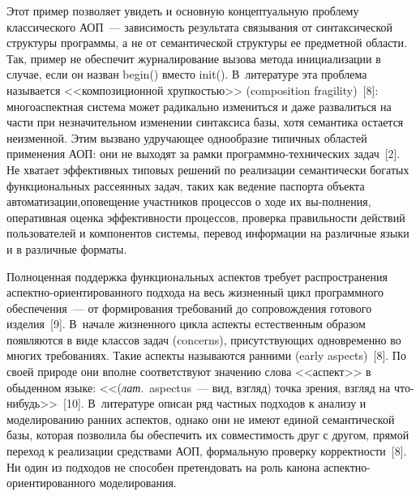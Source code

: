 \begin{multicols}{2}
   Этот пример позволяет увидеть и основную концептуальную проблему 
классического АОП~--- зависи\-мость результата связывания от синтак\-сической 
структуры программы, а не от семан\-ти\-ческой структуры ее предметной 
области. Так, \mbox{пример} не обеспечит журналирование вызова метода 
инициализации в случае, если он назван {\sf begin()} вмес\-то {\sf init()}. 
В~литературе эта проблема называется <<композиционной хрупкостью>> 
(composition fragility)~[8]: многоаспектная сис\-те\-ма может радикально 
измениться и даже развалиться на части при незна\-чительном изменении 
синтаксиса базы, \mbox{хотя} семантика остается неизменной. Этим вызвано 
удру\-ча\-ющее однообразие типичных областей применения АОП: они не 
выходят за рамки про\-грам\-мно-тех\-ни\-че\-ских задач~[2]. Не хватает 
эффективных ти\-по\-вых решений по реализации семантически богатых 
функциональных рассеянных задач, таких как ведение паспорта объекта 
автоматизации,\linebreak опо\-ве\-ще\-ние участников процессов о ходе их вы-\linebreak полнения, 
оперативная оценка эффективности процессов, проверка правильности 
действий пользователей и компонентов системы, перевод информации на 
различные языки и в различные форматы.

\pagebreak
   
   Полноценная поддержка функциональных аспектов требует распространения 
ас\-пект\-но-ори\-ен\-ти\-ро\-ван\-но\-го подхода на весь жизненный цикл 
программного обеспечения~--- от формирования требований до сопровождения 
готового изделия~[9]. В~начале жизненного цикла аспекты естественным 
образом появляются в виде классов задач (concerns), присутствующих 
одновременно во многих требованиях. Такие аспекты называются ранними 
(early aspects)~[8]. По своей природе они вполне соответствуют значению слова 
<<аспект>> в обыденном языке: <<(\textit{лат}.\ aspectus~--- вид, взгляд) точка зрения, 
взгляд на что-ни\-будь>>~[10]. В~литературе описан ряд частных подходов к 
анализу и моделированию ранних аспектов, однако они не имеют единой 
семантической базы, которая позволила бы обеспечить их совместимость друг с 
другом, прямой переход к реализации средствами АОП, формальную проверку 
корректности~[8]. Ни один из подходов не способен претендовать на роль 
канона ас\-пект\-но-ори\-ен\-ти\-ро\-ван\-но\-го моделирования.
   

\end{multicols}
